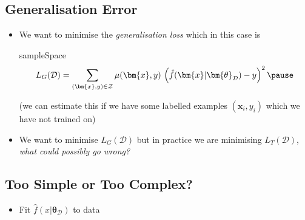 \begin{slide}
\section{Generalisation Error}

\begin{PauseHighLight}
  \begin{itemize}
  \item We want to minimise the \textit{generalisation loss} which in
    this case is
    
    \begin{rightImage}{sampleSpace}
      \begin{align*}
        L_G(\mathcal{D}) = \sum_{(\bm{x},y)\in\mathcal{Z}} \mu(\bm{x},y)\,
        \left(\hat{f}(\bm{x}\vert \bm{\theta}_\mathcal{D}) - y
        \right)^2\pause 
      \end{align*}
    \end{rightImage}

    (we can estimate this if we have some labelled examples
    $(\bm{x}_i,y_i)$ which we have not trained on)\pause
  \item We want to minimise $L_G(\mathcal{D})$ but in practice we are
    minimising $L_T(\mathcal{D})$, \textit{what could possibly go wrong?}\pause
  \end{itemize}
\end{PauseHighLight}

\end{slide}


\begin{slide}
\section[-2]{Too Simple or Too Complex?}

\pb
\hypertarget{regression}{}

\begin{itemize}
\item Fit $\hat{f}(x|\bm{\theta}_\mathcal{D})$ to data\pauseh
  \begin{center}
    \pause
  \end{center}
\end{itemize}

\end{slide}



